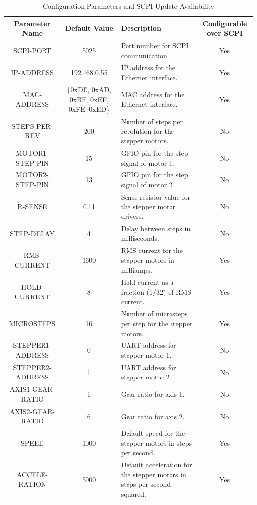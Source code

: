 \begin{table}[h!]
  \centering
  \begin{tabularx}{\textwidth}{|C|C|X|C|}
  \hline
  \textbf{Parameter Name} & \textbf{Default Value} & \textbf{Description} & \textbf{Configurable over SCPI} \\ \hline
  SCPI-PORT               & 5025                   & Port number for SCPI communication. & Yes \\ \hline
  IP-ADDRESS              & 192.168.0.55           & IP address for the Ethernet interface. & Yes \\ \hline
  MAC-ADDRESS             & \{0xDE, 0xAD, 0xBE, 0xEF, 0xFE, 0xED\} & MAC address for the Ethernet interface. & Yes \\ \hline
  STEPS-PER-REV           & 200                    & Number of steps per revolution for the stepper motors. & No \\ \hline
  MOTOR1-STEP-PIN         & 15                     & GPIO pin for the step signal of motor 1. & No \\ \hline
  MOTOR2-STEP-PIN         & 13                     & GPIO pin for the step signal of motor 2. & No \\ \hline
  R-SENSE                 & 0.11                   & Sense resistor value for the stepper motor drivers. & No \\ \hline
  STEP-DELAY              & 4                      & Delay between steps in milliseconds. & No \\ \hline
  RMS-CURRENT             & 1600                  & RMS current for the stepper motors in milliamps. & Yes \\ \hline
  HOLD-CURRENT            & 8                      & Hold current as a fraction (1/32) of RMS current. & Yes \\ \hline
  MICROSTEPS              & 16                     & Number of microsteps per step for the stepper motors. & Yes \\ \hline
  STEPPER1-ADDRESS        & 0                      & UART address for stepper motor 1. & No \\ \hline
  STEPPER2-ADDRESS        & 1                      & UART address for stepper motor 2. & No \\ \hline
  AXIS1-GEAR-RATIO        & 1                      & Gear ratio for axis 1. & No \\ \hline
  AXIS2-GEAR-RATIO        & 6                      & Gear ratio for axis 2. & No \\ \hline
  SPEED                   & 1000                   & Default speed for the stepper motors in steps per second. & Yes \\ \hline
  ACCELE-RATION            & 5000                   & Default acceleration for the stepper motors in steps per second squared. & Yes \\ \hline
  \end{tabularx}
  \caption{Configuration Parameters and SCPI Update Availability}
  \label{tab:config_parameters}
  \end{table}